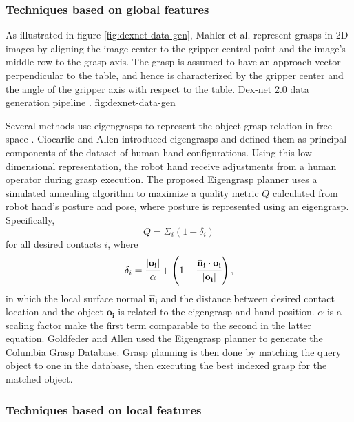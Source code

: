 \subsubsection*{Techniques based on global features}
As illustrated in figure \ref{fig:dexnet-data-gen}, Mahler et al. \cite{mahler2017} represent grasps in 2D images by
aligning the image center to the gripper central point and the image's middle row to the grasp axis. The grasp is
assumed to have an approach vector perpendicular to the table, and hence is characterized by the gripper center and the
angle of the gripper axis with respect to the table.
             {Dex-net 2.0 data generation pipeline \cite{mahler2017}.}
             {fig:dexnet-data-gen}{\textwidth}

Several methods use eigengrasps to represent the object-grasp relation in free space \cite{Goldfeder2011,Ciocarlie2009}.
Ciocarlie and Allen \cite{Ciocarlie2009} introduced eigengrasps and defined them as principal components of the dataset
of human hand configurations. Using this low-dimensional representation, the robot hand receive adjustments from a human
operator during grasp execution. The proposed Eigengrasp planner uses a simulated annealing algorithm to maximize a
quality metric $Q$ calculated from robot hand's posture and pose, where posture is represented using an eigengrasp.
Specifically,
\[ Q = \Sigma_i (1 - \delta_i) \]
for all desired contacts $i$, where
\[ \delta_i = \cfrac{|\mathbf{o_i}|}{\alpha}
              + \left(1 - \cfrac{\mathbf{\hat{n}_i} \cdot \mathbf{o_i}}{|\mathbf{o_i}|} \right), \]
in which the local surface normal $\mathbf{\hat{n}_i}$ and the distance between desired contact location and the
object $\mathbf{o_i}$ is related to the eigengrasp and hand position. $\alpha$ is a scaling factor make the first term
comparable to the second in the latter equation. Goldfeder and Allen \cite{Goldfeder2011} used the Eigengrasp planner
to generate the Columbia Grasp Database. Grasp planning is then done by matching the query object to one in the
database, then executing the best indexed grasp for the matched object.


\subsubsection*{Techniques based on local features} \label{subsub:object_grasp_local}

